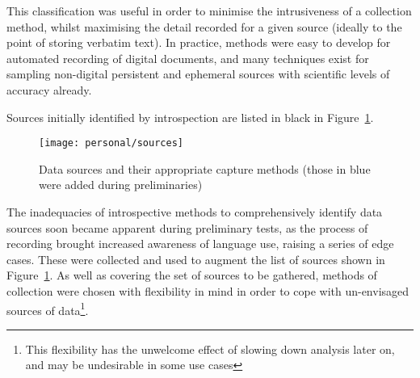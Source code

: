 This classification was useful in order to minimise the intrusiveness of a collection method, whilst maximising the detail recorded for a given source (ideally to the point of storing verbatim text).  In practice, methods were easy to develop for automated recording of digital documents, and many techniques exist for sampling non-digital persistent and ephemeral sources with scientific levels of accuracy already.

Sources initially identified by introspection are listed in black in Figure~\ref{fig:personal:datasources}.

\begin{figure}[ht]
\centering
\texttt{[image: personal/sources]}
\caption{Data sources and their appropriate capture methods (those in blue were added during preliminaries)}
\label{fig:personal:datasources}
\end{figure}



The inadequacies of introspective methods to comprehensively identify data sources soon became apparent during preliminary tests, as the process of recording brought increased awareness of language use, raising a series of edge cases.  These were collected and used to augment the list of sources shown in Figure~\ref{fig:personal:datasources}.  As well as covering the set of sources to be gathered, methods of collection were chosen with flexibility in mind in order to cope with un-envisaged sources of data\footnote{This flexibility has the unwelcome effect of slowing down analysis later on, and may be undesirable in some use cases}.



